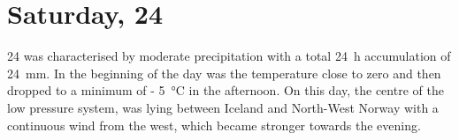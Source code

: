 \section{Saturday, \SI{24}{\dec}}\label{sec:2412}

\SI{24}{\dec} was characterised by moderate precipitation with a total \SI{24}{\hour} accumulation of \SI{24}{\mm}. In the beginning of the day was the temperature close to zero and then dropped to a minimum of \SI{- 5}{\celsius} in the afternoon. On this day, the centre of the low pressure system, was lying between Iceland and North-West Norway with a continuous wind from the west, which became stronger towards the evening.

